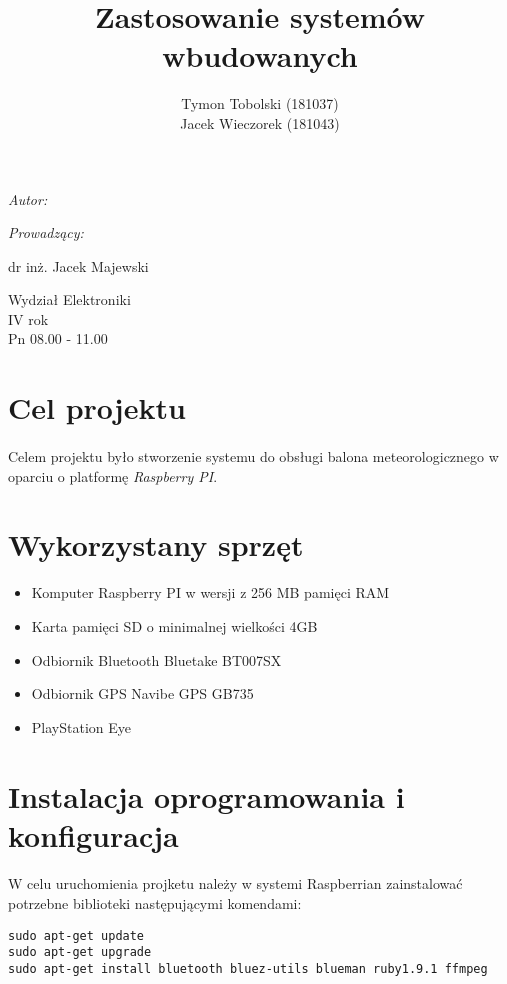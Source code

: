 \documentclass[wide,a4paper,titlepage,12pt]{article}
\title{Zastosowanie systemów wbudowanych}
\author{Tymon Tobolski {\small(181037)}\\ Jacek Wieczorek {\small(181043)}}
\makeatletter
\renewcommand{\maketitle}{
  \begin{titlepage}
    \begin{center}
      \vspace*{3cm}
      \LARGE \@title \par
      \vspace{2cm}
      \textit{\small Autor:}\par
      \normalsize \@author\par \normalsize
      \vspace{3cm}
      \textit{\small Prowadzący:}\par
      dr inż. Jacek Majewski \par
      \vspace{2cm}
      Wydział Elektroniki\\ IV rok\\ Pn 08.00 - 11.00\par

    \end{center}
  \end{titlepage}
}
\makeatother
\begin{document}
\maketitle

\section{Cel projektu} %
\label{sec:cel_projektu}
\paragraph{} %
\label{par:}

Celem projektu było stworzenie systemu do obsługi balona meteorologicznego w oparciu o platformę \textit{Raspberry PI}.
\section{Wykorzystany sprzęt} %
\label{sec:potrzebyn_sprz_t}
\begin{itemize}
  \item Komputer Raspberry PI w wersji z 256 MB pamięci RAM
  \item Karta pamięci SD o minimalnej wielkości 4GB
  \item Odbiornik Bluetooth Bluetake BT007SX
  \item Odbiornik GPS Navibe GPS GB735
  \item PlayStation Eye
\end{itemize}

\section{Instalacja oprogramowania i konfiguracja} %
\label{sec:instalacja_oprogramowania_i_konfiguracja}
\paragraph{} %
\label{par:}
W celu uruchomienia projketu należy w systemi Raspberrian zainstalować potrzebne biblioteki następującymi komendami: 

\begin{lstlisting}
sudo apt-get update
sudo apt-get upgrade
sudo apt-get install bluetooth bluez-utils blueman ruby1.9.1 ffmpeg
\end{lstlisting}
\end{document}
